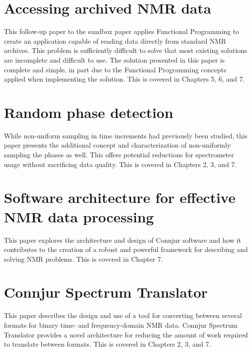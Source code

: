 \section{Accessing archived NMR data}
This follow-up paper to the sandbox paper applies Functional Programming
to create \cite{fenwick2013} an application capable of reading data directly
from standard NMR archives.  This problem is sufficiently difficult to solve
that most existing solutions are incomplete and difficult to use.  The solution
presented in this paper is complete and simple, in part due to the 
Functional Programming concepts applied when implementing the solution.
This is covered in Chapters 5, 6, and 7.


\section{Random phase detection}
While non-uniform sampling in time increments had previously been studied,
this paper \cite{maciejewski2011random} presents the additional concept and
characterization of non-uniformly sampling the phases as well.  This offers
potential reductions for spectrometer usage without sacrificing data quality.
This is covered in Chapters 2, 3, and 7.


\section{Software architecture for effective NMR data processing}
This paper \cite{connjur_pipeline} explores the architecture and design of 
Connjur software and how it contributes to the creation of a robust and
powerful framework for describing and solving NMR problems.
This is covered in Chapter 7.


\section{Connjur Spectrum Translator}
This paper \cite{connjur-st} describes the design and use of a tool for 
converting between several formats for binary time- and frequency-domain
NMR data.  Connjur Spectrum Translator provides a novel architecture for 
reducing the amount of work required to translate between formats.  This is
covered in Chapters 2, 3, and 7.

